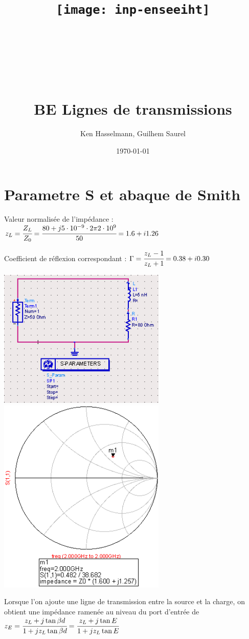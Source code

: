 \documentclass[10pt]{article}
\title{\texttt{[image: inp-enseeiht]} \\ ~ \\ ~ \\ ~ \\ ~ \\BE Lignes de transmissions}
\author{Ken Hasselmann, Guilhem Saurel}
\date{\today}
\begin{document}
 \begin{titlepage}
  \maketitle
  \tableofcontents
 \end{titlepage}

  \section{Parametre S et abaque de Smith}
   Valeur normalisée de l’impédance : $z_L=\cfrac{Z_L}{Z_0}=\cfrac{80 + j 5 \cdot 10^{-9} \cdot 2 \pi 2 \cdot 10^9}{50} = 1.6+i1.26$

   Coefficient de réflexion correspondant : $\Gamma = \cfrac{z_L-1}{z_L+1}=0.38+i0.30$

   \includegraphics[width=8cm]{I2_a_circuit.PNG}
   \includegraphics[width=8cm]{I2_a_smith.PNG}

   \newpage

   Lorsque l’on ajoute une ligne de transmission entre la source et la charge, on obtient une impédance ramenée au niveau du port d’entrée de $z_E = \cfrac{z_L +j \tan{\beta d}}{1 + j z_L \tan{\beta d}}=\cfrac{z_L +j \tan{E}}{1 + j z_L \tan{E}}$
\end{document}
